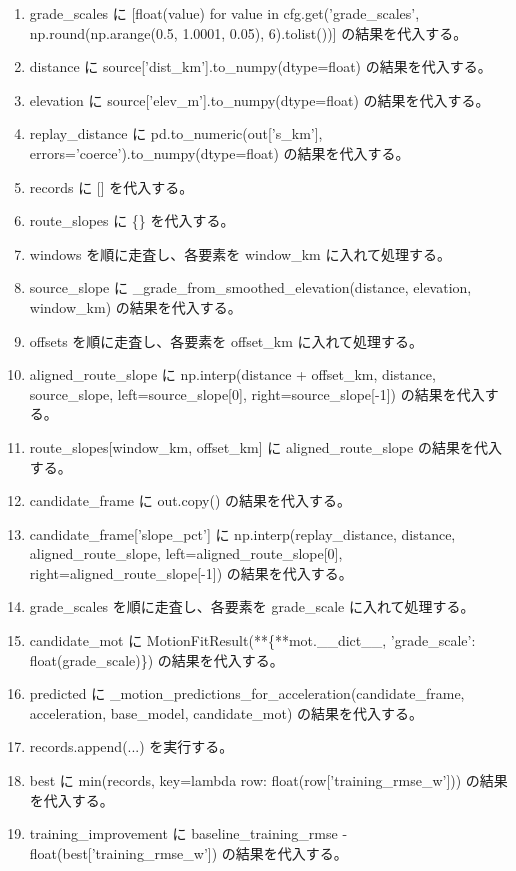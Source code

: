 \documentclass[a4paper,11pt]{article}
\begin{document}
\begin{enumerate}[leftmargin=1.8em]
\item grade\_scales に [float(value) for value in cfg.get('grade\_scales', np.round(np.arange(0.5, 1.0001, 0.05), 6).tolist())] の結果を代入する。
\item distance に source['dist\_km'].to\_numpy(dtype=float) の結果を代入する。
\item elevation に source['elev\_m'].to\_numpy(dtype=float) の結果を代入する。
\item replay\_distance に pd.to\_numeric(out['s\_km'], errors='coerce').to\_numpy(dtype=float) の結果を代入する。
\item records に [] を代入する。
\item route\_slopes に \{\} を代入する。
\item windows を順に走査し、各要素を window\_km に入れて処理する。
\item   source\_slope に \_grade\_from\_smoothed\_elevation(distance, elevation, window\_km) の結果を代入する。
\item   offsets を順に走査し、各要素を offset\_km に入れて処理する。
\item     aligned\_route\_slope に np.interp(distance + offset\_km, distance, source\_slope, left=source\_slope[0], right=source\_slope[-1]) の結果を代入する。
\item     route\_slopes[window\_km, offset\_km] に aligned\_route\_slope の結果を代入する。
\item     candidate\_frame に out.copy() の結果を代入する。
\item     candidate\_frame['slope\_pct'] に np.interp(replay\_distance, distance, aligned\_route\_slope, left=aligned\_route\_slope[0], right=aligned\_route\_slope[-1]) の結果を代入する。
\item     grade\_scales を順に走査し、各要素を grade\_scale に入れて処理する。
\item       candidate\_mot に MotionFitResult(**\{**mot.\_\_dict\_\_, 'grade\_scale': float(grade\_scale)\}) の結果を代入する。
\item       predicted に \_motion\_predictions\_for\_acceleration(candidate\_frame, acceleration, base\_model, candidate\_mot) の結果を代入する。
\item       records.append(...) を実行する。
\item best に min(records, key=lambda row: float(row['training\_rmse\_w'])) の結果を代入する。
\item training\_improvement に baseline\_training\_rmse - float(best['training\_rmse\_w']) の結果を代入する。

\end{enumerate}
\end{document}
